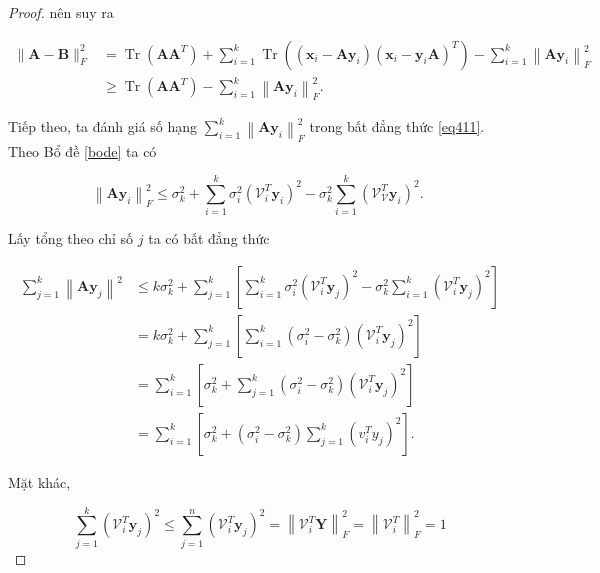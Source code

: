 \documentclass[12pt,a4paper,oneside]{report}
\numberwithin{equation}{section}
\begin{document}
\begin{proof}
nên suy ra

\begin{equation} \label{eq411}
\begin{aligned}
	\|\mathbf{A}-\mathbf{B}\|_{F}^{2} & =\operatorname{Tr}\left(\mathbf{A} \mathbf{A}^{T}\right)+\sum_{i=1}^{k} \operatorname{Tr}\left(\left(\mathbf{x}_{i}-\mathbf{A} \mathbf{y}_{i}\right)\left(\mathbf{x}_{i}-\mathbf{y}_{i} \mathbf{A}\right)^{T}\right)-\sum_{i=1}^{k}\left\|\mathbf{A y}_{i}\right\|_{F}^{2} \\
	& \geqslant \operatorname{Tr}\left(\mathbf{A} \mathbf{A}^{T}\right)-\sum_{i=1}^{k}\left\|\mathbf{A y}_{i}\right\|_{F}^{2} .
\end{aligned}
\end{equation}

Tiếp theo, ta đánh giá số hạng $\sum_{i=1}^{k}\left\|\mathbf{A y}_{i}\right\|_{F}^{2}$ trong bất đẳng thức \ref{eq411}. Theo Bổ đề \ref{bode} ta có

$$
\left\|\mathbf{A y}_{i}\right\|_{F}^{2} \leqslant \sigma_{k}^{2}+\sum_{i=1}^{k} \sigma_{i}^{2}\left(\mathcal{V}_{i}^{T} \mathbf{y}_{i}\right)^{2}-\sigma_{k}^{2} \sum_{i=1}^{k}\left(\mathcal{V}_{\mathcal{V}}^{T} \mathbf{y}_{i}\right)^{2} \text {. }
$$

Lấy tổng theo chỉ số $j$ ta có bất đẳng thức

$$
\begin{aligned}
	\sum_{j=1}^{k}\left\|\mathbf{A y}_{j}\right\|^{2} & \leqslant k \sigma_{k}^{2}+\sum_{j=1}^{k}\left[\sum_{i=1}^{k} \sigma_{i}^{2}\left(\mathcal{V}_{i}^{T} \mathbf{y}_{j}\right)^{2}-\sigma_{k}^{2} \sum_{i=1}^{k}\left(\mathcal{V}_{i}^{T} \mathbf{y}_{j}\right)^{2}\right] \\
	& =k \sigma_{k}^{2}+\sum_{j=1}^{k}\left[\sum_{i=1}^{k}\left(\sigma_{i}^{2}-\sigma_{k}^{2}\right)\left(\mathcal{V}_{i}^{T} \mathbf{y}_{j}\right)^{2}\right] \\
	& =\sum_{i=1}^{k}\left[\sigma_{k}^{2}+\sum_{j=1}^{k}\left(\sigma_{i}^{2}-\sigma_{k}^{2}\right)\left(\mathcal{V}_{i}^{T} \mathbf{y}_{j}\right)^{2}\right] \\
	& =\sum_{i=1}^{k}\left[\sigma_{k}^{2}+\left(\sigma_{i}^{2}-\sigma_{k}^{2}\right) \sum_{j=1}^{k}\left(v_{i}^{T} y_{j}\right)^{2}\right] .
\end{aligned}
$$

Mặt khác,

$$
\sum_{j=1}^{k}\left(\mathcal{V}_{i}^{T} \mathbf{y}_{j}\right)^{2} \leqslant \sum_{j=1}^{n}\left(\mathcal{V}_{i}^{T} \mathbf{y}_{j}\right)^{2}=\left\|\mathcal{V}_{i}^{T} \mathbf{Y}\right\|_{F}^{2}=\left\|\mathcal{V}_{i}^{T}\right\|_{F}^{2}=1
$$


\end{proof}
\end{document}
